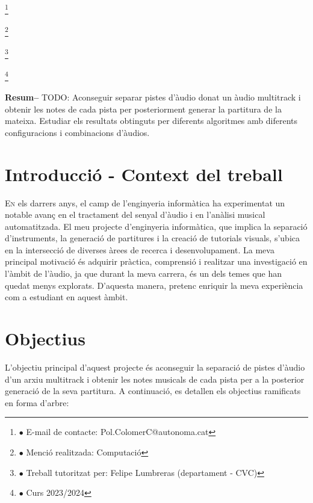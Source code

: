 ﻿\documentclass[10pt,a4paper,twocolumn,twoside]{article}
\newcommand\blfootnote[1]{%
  \begingroup
  \renewcommand\thefootnote{}\footnote{#1}%
  \addtocounter{footnote}{-1}%
  \endgroup
}
\begin{document}
\blfootnote{$\bullet$ E-mail de contacte: Pol.ColomerC@autonoma.cat}
\blfootnote{$\bullet$ Menció realitzada: Computació}
\blfootnote{$\bullet$ Treball tutoritzat per: Felipe Lumbreras (departament - CVC)}
\blfootnote{$\bullet$ Curs 2023/2024}

\textbf{Resum--}
TODO: Aconseguir separar pistes d’àudio donat un àudio multitrack i obtenir les notes de cada pista per posteriorment generar la partitura de la mateixa. Estudiar els resultats obtinguts per diferents algoritmes amb diferents configuracions i combinacions d’àudios.


\section{Introducció - Context del treball}
\label{sec:intro}

\lettrine[lines=3]{E}{n} els darrers anys, el camp de l'enginyeria informàtica ha experimentat un notable avanç en el tractament del senyal d'àudio i en l'anàlisi musical automatitzada. El meu projecte d'enginyeria informàtica, que implica la separació d'instruments, la generació de partitures i la creació de tutorials visuals, s'ubica en la intersecció de diverses àrees de recerca i desenvolupament. La meva principal motivació és adquirir pràctica, comprensió i realitzar una investigació en l'àmbit de l'àudio, ja que durant la meva carrera, és un dels temes que han quedat menys explorats. D'aquesta manera, pretenc enriquir la meva experiència com a estudiant en aquest àmbit.


\section{Objectius}
\label{sec:objectius}

L'objectiu principal d'aquest projecte és aconseguir la separació de pistes d'àudio d'un arxiu multitrack i obtenir les notes musicals de cada pista per a la posterior generació de la seva partitura. A continuació, es detallen els objectius ramificats en forma d'arbre:
\end{document}
